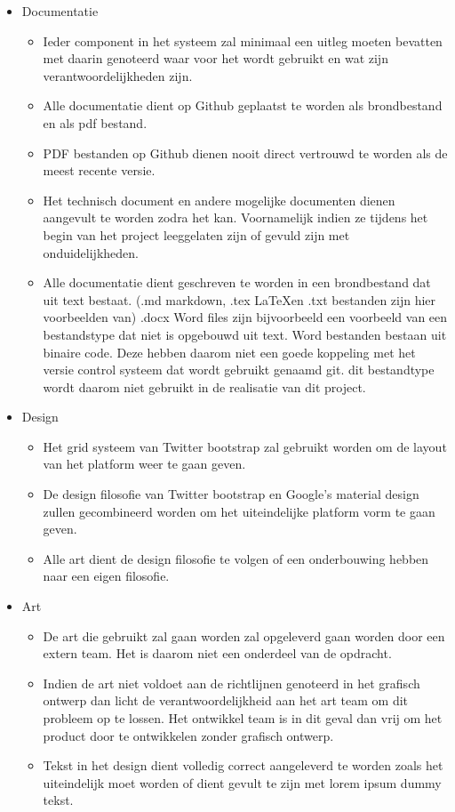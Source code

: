 \documentclass[]{report}
\begin{document}
\begin{itemize}
	\item Documentatie
	\begin{itemize}
		\item Ieder component in het systeem zal minimaal een uitleg moeten bevatten met daarin genoteerd waar voor het wordt gebruikt en wat zijn verantwoordelijkheden zijn.
		\item Alle documentatie dient op Github geplaatst te worden als brondbestand en als pdf bestand.
		\item PDF bestanden op Github dienen nooit direct vertrouwd te worden als de meest recente versie.
		\item Het technisch document en andere mogelijke documenten dienen aangevult te worden zodra het kan. Voornamelijk indien ze tijdens het begin van het project leeggelaten zijn of gevuld zijn met onduidelijkheden.
		\item Alle documentatie dient geschreven te worden in een brondbestand dat uit text bestaat. (.md markdown, .tex \LaTeX en .txt bestanden zijn hier voorbeelden van) .docx Word files zijn bijvoorbeeld een voorbeeld van een bestandstype dat niet is opgebouwd uit text. Word bestanden bestaan uit binaire code. Deze hebben daarom niet een goede koppeling met het versie control systeem dat wordt gebruikt genaamd git. dit bestandtype wordt daarom niet gebruikt in de realisatie van dit project.
		\newline
	\end{itemize}

	\item Design
	\begin{itemize}
		\item Het grid systeem van Twitter bootstrap zal gebruikt worden om de layout van het platform weer te gaan geven.
		\item De design filosofie van Twitter bootstrap en Google's material design zullen gecombineerd worden om het uiteindelijke platform vorm te gaan geven.
		\item Alle art dient de design filosofie te volgen of een onderbouwing hebben naar een eigen filosofie.
		\newline
	\end{itemize}

	\item Art
	\begin{itemize}
		\item De art die gebruikt zal gaan worden zal opgeleverd gaan worden door een extern team. Het is daarom niet een onderdeel van de opdracht.
		\item Indien de art niet voldoet aan de richtlijnen genoteerd in het grafisch ontwerp dan licht de verantwoordelijkheid aan het art team om dit probleem op te lossen. Het ontwikkel team is in dit geval dan vrij om het product door te ontwikkelen zonder grafisch ontwerp.
		\item Tekst in het design dient volledig correct aangeleverd te worden zoals het uiteindelijk moet worden of dient gevult te zijn met lorem ipsum dummy tekst.
		\newline
	\end{itemize}

\end{itemize} 
\end{document}
